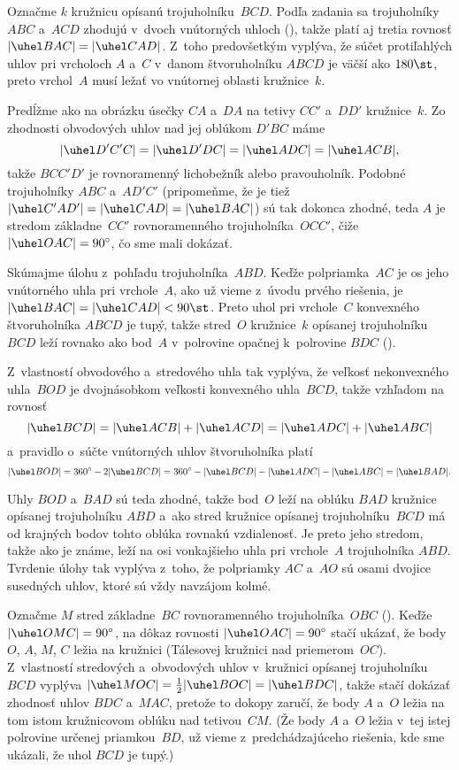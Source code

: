 {%
Označme $k$ kružnicu opísanú trojuholníku~$BCD$.
Podľa zadania sa trojuholníky $ABC$ a~$ACD$ zhodujú v~dvoch vnútorných
uhloch (\obr), takže platí aj tretia rovnosť $|\uhel BAC|=|\uhel CAD|$.
Z~toho predovšetkým vyplýva, že súčet protiľahlých uhlov pri vrcholoch $A$ a~$C$
v~danom štvoruholníku $ABCD$ je väčší ako $180\st$, preto vrchol~$A$
musí ležať vo vnútornej oblasti kružnice~$k$.
%

Predĺžme ako na obrázku úsečky $CA$ a~$DA$ na tetivy $CC'$
a~$DD'$ kružnice~$k$.
Zo zhodnosti obvodových uhlov nad jej oblúkom $D'BC$ máme
$$
|\uhel D'C'C| =|\uhel D'DC|=|\uhel ADC| = |\uhel ACB|,
$$
takže $BCC'D'$ je rovnoramenný lichobežník alebo pravouholník. Podobné trojuholníky $ABC$ a~$AD'C'$
(pripomeňme, že je tiež $|\uhel C'AD'|=|\uhel CAD|=|\uhel BAC|$)
sú tak dokonca zhodné, teda $A$ je stredom základne~$CC'$
rovnoramenného trojuholníka~$OCC'$, čiže $|\uhel OAC|=90^\circ$,
čo sme mali dokázať.

\ineres
Skúmajme úlohu z~pohľadu trojuholníka~$ABD$.
Keďže polpriamka~$AC$ je os jeho vnútorného uhla pri vrchole~$A$,
ako už vieme z~úvodu prvého riešenia,
je $|\uhel BAC|=|\uhel CAD|<90\st$.
Preto uhol pri vrchole~$C$ konvexného štvoruholníka $ABCD$ je tupý,
takže stred~$O$ kružnice~$k$ opísanej trojuholníku~$BCD$ leží
rovnako ako bod~$A$ v~polrovine opačnej k~polrovine $BDC$ (\obr).
%

Z~vlastností obvodového a~stredového uhla tak vyplýva, že veľkosť nekonvexného
uhla~$BOD$ je dvojnásobkom veľkosti konvexného uhla~$BCD$, takže
vzhľadom na rovnosť
$$
|\uhel BCD|=|\uhel ACB|+|\uhel ACD|=|\uhel ADC|+|\uhel ABC|
$$
a~pravidlo o~súčte vnútorných uhlov štvoruholníka platí
$$
|\uhel BOD|=360^\circ -2|\uhel BCD|=360^\circ-|\uhel BCD|
-|\uhel ADC|-|\uhel ABC|=|\uhel BAD|.
$$

Uhly $BOD$ a~$BAD$ sú teda zhodné, takže bod~$O$ leží na oblúku
$BAD$ kružnice opísanej trojuholníku $ABD$ a~ako stred kružnice
opísanej trojuholníku~$BCD$ má od krajných bodov tohto
oblúka rovnakú vzdialenosť. Je preto jeho stredom, takže ako je známe, leží
na osi vonkajšieho uhla pri vrchole~$A$ trojuholníka $ABD$.
Tvrdenie úlohy tak vyplýva z~toho, že polpriamky $AC$ a~$AO$ sú
osami dvojice susedných uhlov, ktoré sú vždy navzájom kolmé.


\ineres
Označme $M$ stred základne~$BC$ rovnoramenného trojuholníka~$OBC$ (\obr). Keďže
$|\uhel OMC|=90^\circ$, na dôkaz rovnosti $|\uhel OAC|=90^\circ$ stačí
ukázať, že body $O$, $A$, $M$, $C$ ležia na kružnici
(Tálesovej kružnici nad priemerom~$OC$).
Z~vlastností stredových a~obvodových uhlov v~kružnici opísanej
trojuholníku $BCD$ vyplýva $|\uhel MOC|=\frac12
|\uhel BOC|=|\uhel BDC|$, takže stačí dokázať zhodnosť
uhlov $BDC$ a~$MAC$,
pretože to dokopy zaručí, že body $A$ a~$O$ ležia na tom istom
kružnicovom oblúku nad tetivou~$CM$.
(Že body $A$ a~$O$ ležia v~tej istej polrovine určenej priamkou~$BD$,
už vieme z~predchádzajúceho riešenia, kde sme ukázali, že uhol $BCD$ je tupý.)
%

}
